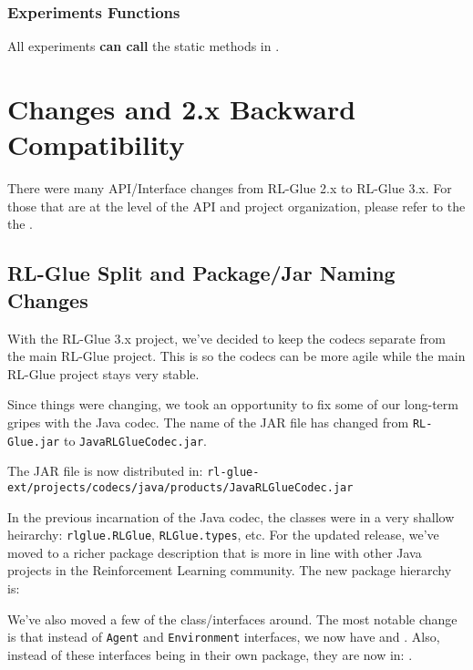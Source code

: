 \documentclass[11pt]{article}
\begin{document}
\subsubsection{Experiments Functions}
All experiments \textbf{can call} the static methods in .

\section{Changes and 2.x Backward Compatibility}
There were many API/Interface changes from RL-Glue 2.x to RL-Glue 3.x.  For those that are at the level of the API and project organization, please refer to the the .

\subsection{RL-Glue Split and Package/Jar Naming Changes}
With the RL-Glue 3.x project, we've decided to keep the codecs separate from the main RL-Glue project.  This is so the codecs can be more agile while the main RL-Glue project stays very stable.

Since things were changing, we took an opportunity to fix some of our long-term gripes with the Java codec.  The name of the JAR file has changed from \texttt{RL-Glue.jar} to \texttt{JavaRLGlueCodec.jar}.

The JAR file is now distributed in:\newline
\texttt{rl-glue-ext/projects/codecs/java/products/JavaRLGlueCodec.jar}

In the previous incarnation of the Java codec, the classes were in a very shallow heirarchy: \texttt{rlglue.RLGlue}, \texttt{RLGlue.types}, etc.  For the updated release, we've moved to a richer package description that
is more in line with other Java projects in the Reinforcement Learning community.  The new package hierarchy is:\newline
{}

We've also moved a few of the class/interfaces around.  The most notable change is that instead of \texttt{Agent} and \texttt{Environment} interfaces, we now have 
 and 
.
Also, instead of these interfaces being in their own package, they are now in: . 
\end{document}
